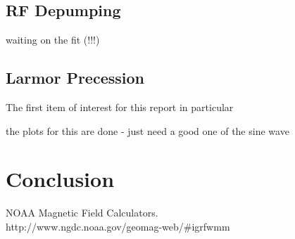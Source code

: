 \documentclass{article}
\begin{document}
    \hspace{.25cm}

  \subsection{RF Depumping}
    waiting on the fit (!!!)

  \subsection{Larmor Precession}
    The first item of interest for this report in particular

    the plots for this are done - just need a good one of the sine wave


\section{Conclusion}%

\begin{thebibliography}{10}
    NOAA Magnetic Field Calculators. \\ http://www.ngdc.noaa.gov/geomag-web/\#igrfwmm

\end{thebibliography}
\end{document}
